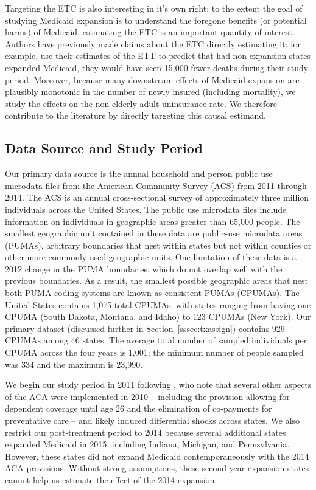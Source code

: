 \documentclass[aoas]{imsart}
\theoremstyle{plain}
\theoremstyle{remark}
\begin{document}
Targeting the ETC is also interesting in it's own right: to the extent the goal of studying Medicaid expansion is to understand the foregone benefits (or potential harms) of Medicaid, estimating the ETC is an important quantity of interest. Authors have previously made claims about the ETC directly estimating it: for example, \cite{miller2019medicaid} use their estimates of the ETT to predict that had non-expansion states expanded Medicaid, they would have seen 15,000 fewer deaths during their study period. Moreover, because many downstream effects of Medicaid expansion are plausibly monotonic in the number of newly insured (including mortality), we study the effects on the non-elderly adult uninsurance rate. We therefore contribute to the literature by directly targeting this causal estimand.

\subsection{Data Source and Study Period}\label{ssec:data}

Our primary data source is the annual household and person public use microdata files from the American Community Survey (ACS) from 2011 through 2014. The ACS is an annual cross-sectional survey of approximately three million individuals across the United States. The public use microdata files include information on individuals in geographic areas greater than 65,000 people. The smallest geographic unit contained in these data are public-use microdata areas (PUMAs), arbitrary boundaries that nest within states but not within counties or other more commonly used geographic units. One limitation of these data is a 2012 change in the PUMA boundaries, which do not overlap well with the previous boundaries. As a result, the smallest possible geographic areas that nest both PUMA coding systems are known as consistent PUMAs (CPUMAs). The United States contains 1,075 total CPUMAs, with states ranging from having one CPUMA (South Dakota, Montana, and Idaho) to 123 CPUMAs (New York). Our primary dataset (discussed further in Section~\ref{sssec:txassign}) contains 929 CPUMAs among 46 states. The average total number of sampled individuals per CPUMA across the four years is 1,001; the minimum number of people sampled was 334 and the maximum is 23,990.

We begin our study period in 2011 following \cite{courtemanche2017early}, who note that several other aspects of the ACA were implemented in 2010 -- including the provision allowing for dependent coverage until age 26 and the elimination of co-payments for preventative care -- and likely induced differential shocks across states. We also restrict our post-treatment period to 2014 because several additional states expanded Medicaid in 2015, including Indiana, Michigan, and Pennsylvania. However, these states did not expand Medicaid contemporaneously with the 2014 ACA provisions. Without strong assumptions, these second-year expansion states cannot help us estimate the effect of the 2014 expansion. 
\end{document}
